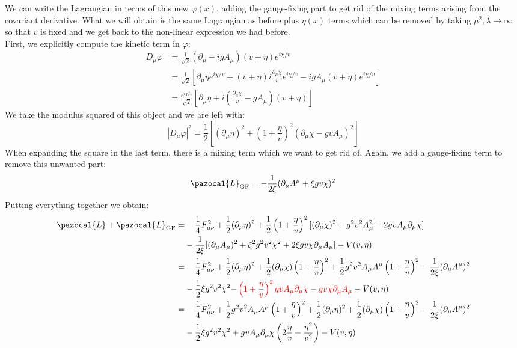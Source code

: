 \documentclass[../main.tex]{subfiles}
\begin{document}
We can write the Lagrangian in terms of this new $\varphi(x)$, adding the gauge-fixing part to get rid of the mixing terms arising from the covariant derivative. What we will obtain is the same Lagrangian as before plus $\eta(x)$ terms which can be removed by taking $\mu^2,\lambda\to\infty$ so that $v$ is fixed and we get back to the non-linear expression we had before.\\
First, we explicitly compute the kinetic term in $\varphi$:
\begin{align*}
D_\mu\varphi&=\frac{1}{\sqrt{2}}(\partial_\mu-igA_\mu)(v+\eta)e^{i\chi/v}\\
&=\frac{1}{\sqrt{2}}\left[\partial_\mu\eta e^{i\chi/v}+(v+\eta)i\frac{\partial_\mu\chi}{v}e^{i\chi/v}-igA_\mu(v+\eta)e^{i\chi/v}\right]\\
&=\frac{e^{i\chi/v}}{\sqrt{2}}\left[\partial_\mu\eta+i\left(\frac{\partial_\mu\chi}{v}-gA_\mu\right)(v+\eta)\right]
\end{align*}
We take the modulus squared of this object and we are left with:
\[
|D_\mu\varphi|^2=\frac{1}{2}\left[(\partial_\mu\eta)^2+\left(1+\frac{\eta}{v}\right)^2(\partial_\mu\chi-gvA_\mu)^2\right]
\]
When expanding the square in the last term, there is a mixing term which we want to get rid of. Again, we add a gauge-fixing term to remove this unwanted part:
\[
\pazocal{L}_{\text{GF}}=-\frac{1}{2\xi}(\partial_\mu A^\mu+\xi gv\chi)^2
\]
Putting everything together we obtain:
\begin{align*}
\pazocal{L}+\pazocal{L}_{\text{GF}}=&-\frac{1}{4}F_{\mu\nu}^2+\frac{1}{2}(\partial_\mu\eta)^2+\frac{1}{2}\left(1+\frac{\eta}{v}\right)^2[(\partial_\mu\chi)^2+g^2v^2A_\mu^2-2gvA_\mu\partial_\mu\chi]\\
&-\frac{1}{2\xi}[(\partial_\mu A_\mu)^2+\xi^2g^2v^2\chi^2+2\xi gv\chi\partial_\mu A_\mu]-V(v,\eta)\\
=&-\frac{1}{4}F_{\mu\nu}^2+\frac{1}{2}(\partial_\mu\eta)^2+\frac{1}{2}(\partial_\mu\chi)\left(1+\frac{\eta}{v}\right)^2+\frac{1}{2}g^2v^2A_\mu A^\mu\left(1+\frac{\eta}{v}\right)^2-\frac{1}{2\xi}(\partial_\mu A^\mu)^2\\
&-\frac{1}{2}\xi g^2v^2\chi^2{\color{red}-\left(1+\frac{\eta}{v}\right)^2gvA_\mu\partial_\mu\chi-gv\chi\partial_\mu A_\mu}-V(v,\eta)\\
=&-\frac{1}{4}F_{\mu\nu}^2+\frac{1}{2}g^2v^2A_\mu A^\mu\left(1+\frac{\eta}{v}\right)^2+\frac{1}{2}(\partial_\mu\eta)^2+\frac{1}{2}(\partial_\mu\chi)\left(1+\frac{\eta}{v}\right)^2-\frac{1}{2\xi}(\partial_\mu A^\mu)^2\\
&-\frac{1}{2}\xi g^2v^2\chi^2+gvA_\mu\partial_\mu\chi\left(2\frac{\eta}{v}+\frac{\eta^2}{v^2}\right)-V(v,\eta)
\end{align*}
\end{document}
